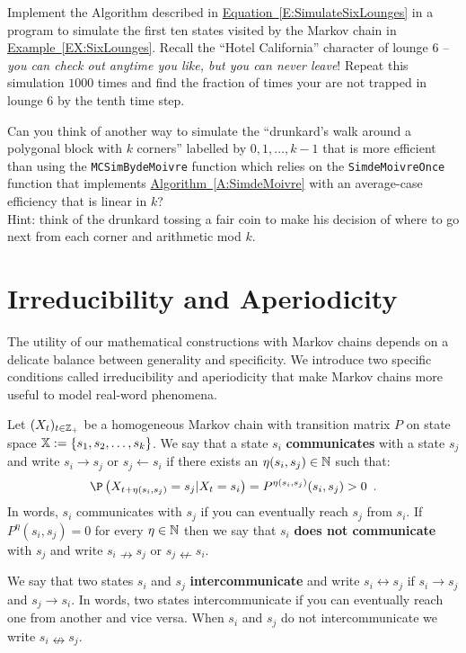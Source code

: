 \begin{simulation}\label{SIM:TrappedinLounge6}
Implement the Algorithm described in \hyperref[E:SimulateSixLounges]{Equation~\ref*{E:SimulateSixLounges}} in a \Matlab program to simulate the first ten states visited by the Markov chain in \hyperref[EX:SixLounges]{Example~\ref*{EX:SixLounges}}.  Recall the ``Hotel California'' character of  lounge $6$ -- {\em  you can check out anytime you like, but you can never leave}!  Repeat this simulation $1000$ times and find the fraction of times your are not trapped in lounge $6$ by the  tenth time step. 
\end{simulation}

\begin{exercise}\label{EXR:DrunkardWalkOnKGon}
Can you think of another way to simulate the ``drunkard's walk around a polygonal block with $k$ corners'' labelled by $0,1,\ldots, k-1$ that is more efficient than using the {\tt MCSimBydeMoivre} function which  relies on the {\tt SimdeMoivreOnce} function that implements \hyperref[A:SimdeMoivre]{Algorithm~\ref*{A:SimdeMoivre}} with an average-case efficiency that is linear in $k$?\\  {\scriptsize Hint: think of the drunkard tossing a fair coin to make his decision of where to go next from each corner and arithmetic mod $k$.}
\end{exercise}

\section{Irreducibility and Aperiodicity}\label{S:IrredAperiod}
The utility of our mathematical constructions with Markov chains depends on a delicate balance between generality and specificity.  We introduce two specific conditions called irreducibility and aperiodicity that make Markov chains more useful to model real-word phenomena.


\begin{definition}\label{D:Communication} Let $(X_t)_{t\in\mathbb{Z}_+}$ be a homogeneous Markov chain with transition matrix $P$ on state space $\mathbb{X}:=\{s_1,s_2,\ldots,s_k\}$.  
We say that a state $s_i$ {\bf communicates} with a state $s_j$ and write $s_i \rightarrow s_j$ or $s_j \leftarrow s_i$ if there exists an $\eta(s_i,s_j) \in \mathbb{N}$ such that:
\[
\P \left( X_{t+\eta(s_i,s_j)} = s_j | X_t = s_i \right) = P^{\eta(s_i,s_j)} (s_i, s_j) > 0 \enspace .
\] 
In words, $s_i$ communicates with $s_j$ if you can eventually reach $s_j$ from $s_i$.  If $P^{\eta} (s_i, s_j)=0$ for every $\eta \in \mathbb{N}$ then we say that $s_i$ {\bf does not communicate} with $s_j$ and write $s_i  \nrightarrow s_j$ or $s_j  \nleftarrow s_i$.

We say that two states $s_i$ and $s_j$ {\bf intercommunicate} and write $s_i \leftrightarrow s_j$ if $s_i \rightarrow s_j$ and $s_j \rightarrow s_i$.  In words, two states intercommunicate if you can eventually reach one from another and vice versa.  When $s_i$ and $s_j$ do not intercommunicate we write $s_i \nleftrightarrow s_j$.
\end{definition}


